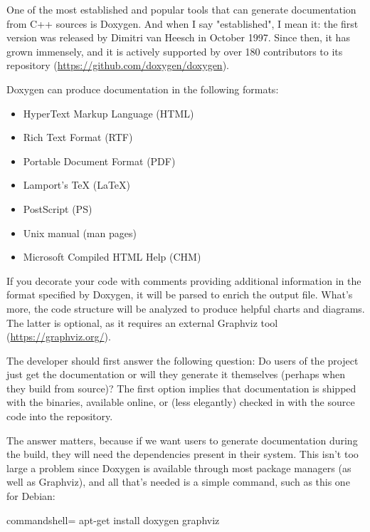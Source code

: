 One of the most established and popular tools that can generate documentation from C++ sources is Doxygen. And when I say "established", I mean it: the first version was released by Dimitri van Heesch in October 1997. Since then, it has grown immensely, and it is actively supported by over 180 contributors to its repository (\url{https://github.com/doxygen/doxygen}).

Doxygen can produce documentation in the following formats:

\begin{itemize}
\item 
HyperText Markup Language (HTML)

\item 
Rich Text Format (RTF)

\item 
Portable Document Format (PDF)

\item 
Lamport's TeX (LaTeX)

\item 
PostScript (PS)

\item 
Unix manual (man pages)

\item 
Microsoft Compiled HTML Help (CHM)
\end{itemize}

If you decorate your code with comments providing additional information in the format specified by Doxygen, it will be parsed to enrich the output file. What's more, the code structure will be analyzed to produce helpful charts and diagrams. The latter is optional, as it requires an external Graphviz tool (\url{https://graphviz.org/}).

The developer should first answer the following question: Do users of the project just get the documentation or will they generate it themselves (perhaps when they build from source)? The first option implies that documentation is shipped with the binaries, available online, or (less elegantly) checked in with the source code into the repository.

The answer matters, because if we want users to generate documentation during the build, they will need the dependencies present in their system. This isn't too large a problem since Doxygen is available through most package managers (as well as Graphviz), and all that's needed is a simple command, such as this one for Debian:

\begin{tcblisting}{commandshell={}}
apt-get install doxygen graphviz
\end{tcblisting}

